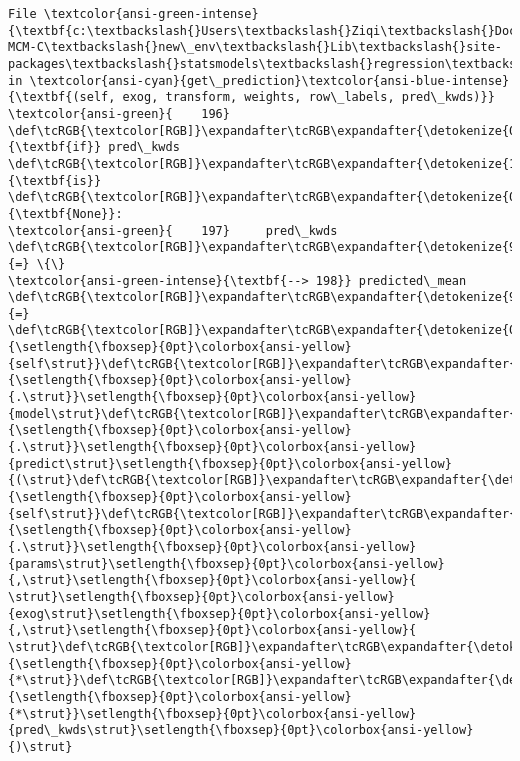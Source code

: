 \documentclass[11pt]{article}
\begin{document}
\begin{Verbatim}[commandchars=\\\{\}, frame=single, framerule=2mm, rulecolor=\color{outerrorbackground}]
File \textcolor{ansi-green-intense}{\textbf{c:\textbackslash{}Users\textbackslash{}Ziqi\textbackslash{}Documents\textbackslash{}Python\textbackslash{}2025-MCM-C\textbackslash{}new\_env\textbackslash{}Lib\textbackslash{}site-packages\textbackslash{}statsmodels\textbackslash{}regression\textbackslash{}\_prediction.py:198}}, in \textcolor{ansi-cyan}{get\_prediction}\textcolor{ansi-blue-intense}{\textbf{(self, exog, transform, weights, row\_labels, pred\_kwds)}}
\textcolor{ansi-green}{    196} \def\tcRGB{\textcolor[RGB]}\expandafter\tcRGB\expandafter{\detokenize{0,135,0}}{\textbf{if}} pred\_kwds \def\tcRGB{\textcolor[RGB]}\expandafter\tcRGB\expandafter{\detokenize{175,0,255}}{\textbf{is}} \def\tcRGB{\textcolor[RGB]}\expandafter\tcRGB\expandafter{\detokenize{0,135,0}}{\textbf{None}}:
\textcolor{ansi-green}{    197}     pred\_kwds \def\tcRGB{\textcolor[RGB]}\expandafter\tcRGB\expandafter{\detokenize{98,98,98}}{=} \{\}
\textcolor{ansi-green-intense}{\textbf{--> 198}} predicted\_mean \def\tcRGB{\textcolor[RGB]}\expandafter\tcRGB\expandafter{\detokenize{98,98,98}}{=} \def\tcRGB{\textcolor[RGB]}\expandafter\tcRGB\expandafter{\detokenize{0,135,0}}{\setlength{\fboxsep}{0pt}\colorbox{ansi-yellow}{self\strut}}\def\tcRGB{\textcolor[RGB]}\expandafter\tcRGB\expandafter{\detokenize{98,98,98}}{\setlength{\fboxsep}{0pt}\colorbox{ansi-yellow}{.\strut}}\setlength{\fboxsep}{0pt}\colorbox{ansi-yellow}{model\strut}\def\tcRGB{\textcolor[RGB]}\expandafter\tcRGB\expandafter{\detokenize{98,98,98}}{\setlength{\fboxsep}{0pt}\colorbox{ansi-yellow}{.\strut}}\setlength{\fboxsep}{0pt}\colorbox{ansi-yellow}{predict\strut}\setlength{\fboxsep}{0pt}\colorbox{ansi-yellow}{(\strut}\def\tcRGB{\textcolor[RGB]}\expandafter\tcRGB\expandafter{\detokenize{0,135,0}}{\setlength{\fboxsep}{0pt}\colorbox{ansi-yellow}{self\strut}}\def\tcRGB{\textcolor[RGB]}\expandafter\tcRGB\expandafter{\detokenize{98,98,98}}{\setlength{\fboxsep}{0pt}\colorbox{ansi-yellow}{.\strut}}\setlength{\fboxsep}{0pt}\colorbox{ansi-yellow}{params\strut}\setlength{\fboxsep}{0pt}\colorbox{ansi-yellow}{,\strut}\setlength{\fboxsep}{0pt}\colorbox{ansi-yellow}{ \strut}\setlength{\fboxsep}{0pt}\colorbox{ansi-yellow}{exog\strut}\setlength{\fboxsep}{0pt}\colorbox{ansi-yellow}{,\strut}\setlength{\fboxsep}{0pt}\colorbox{ansi-yellow}{ \strut}\def\tcRGB{\textcolor[RGB]}\expandafter\tcRGB\expandafter{\detokenize{98,98,98}}{\setlength{\fboxsep}{0pt}\colorbox{ansi-yellow}{*\strut}}\def\tcRGB{\textcolor[RGB]}\expandafter\tcRGB\expandafter{\detokenize{98,98,98}}{\setlength{\fboxsep}{0pt}\colorbox{ansi-yellow}{*\strut}}\setlength{\fboxsep}{0pt}\colorbox{ansi-yellow}{pred\_kwds\strut}\setlength{\fboxsep}{0pt}\colorbox{ansi-yellow}{)\strut}

\end{Verbatim}
\end{document}
